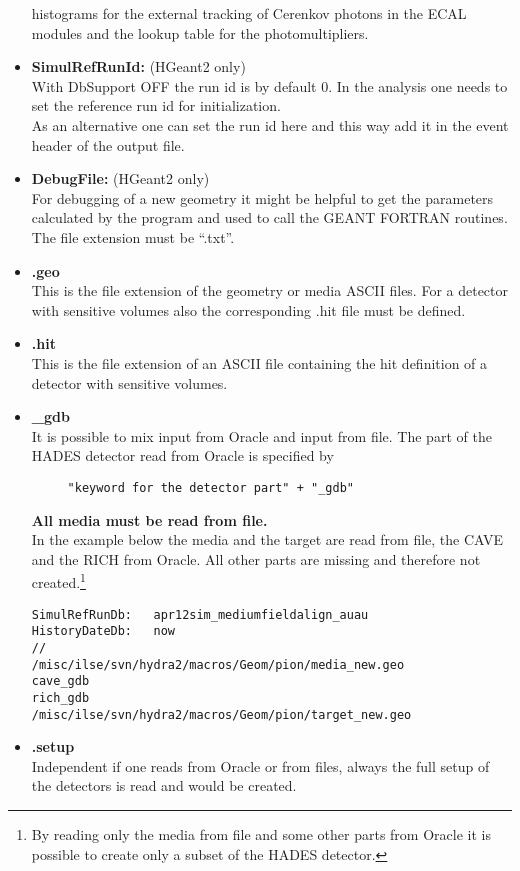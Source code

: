 \begin{itemize}
   histograms for the external tracking of Cerenkov photons in the ECAL modules and the lookup table for the photomultipliers.
 \item \textbf{SimulRefRunId:} (HGeant2 only)\\
   With DbSupport OFF the run id is by default 0. In the analysis one needs to set the reference run id for initialization.\\
   As an alternative one can set the run id here and this way add it in the event header of the output file.
 \item \textbf{DebugFile:} (HGeant2 only)\\
   For debugging of a new geometry it might be helpful to get the parameters calculated by the program and used to call the
   GEANT FORTRAN routines. The file extension must be ``.txt''.
 \item \textbf{.geo}\\
   This is the file extension of the geometry or media ASCII files. For a detector with sensitive volumes also the corresponding 
   .hit file must be defined.
 \item \textbf{.hit}\\
   This is the file extension of an ASCII file containing the hit definition of a detector with sensitive volumes.
 \item \textbf{\_gdb}\\
   It is possible to mix input from Oracle and input from file. The part of the HADES detector read from Oracle is 
   specified by
   \begin{lstlisting}
     "keyword for the detector part" + "_gdb"
   \end{lstlisting}
   \textbf{All media must be read from file.}\\
   In the example below the media and the target are read from file, the CAVE and the RICH from Oracle. All other parts are 
   missing and therefore not created.\footnote{By reading only the media from file and some other parts from Oracle 
   it is possible to create only a subset of the HADES detector.}
   \begin{lstlisting}
SimulRefRunDb:   apr12sim_mediumfieldalign_auau
HistoryDateDb:   now
//
/misc/ilse/svn/hydra2/macros/Geom/pion/media_new.geo
cave_gdb
rich_gdb
/misc/ilse/svn/hydra2/macros/Geom/pion/target_new.geo
   \end{lstlisting}
 \item \textbf{.setup}\\
   Independent if one reads from Oracle or from files, always the full setup of the detectors is read and would be created.\\

\end{itemize}
